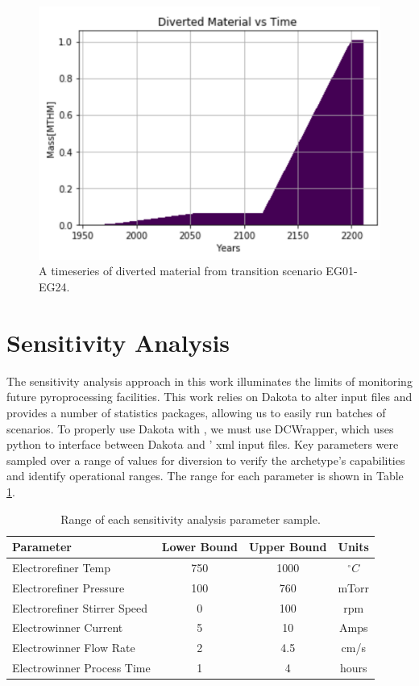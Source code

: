 \begin{figure}
	\centering
	\includegraphics[width=0.9\linewidth]{images/divertmat}
	\caption{A timeseries of diverted material from transition scenario EG01-EG24.}
	\label{fig:divertmat}
\end{figure}

\section{Sensitivity Analysis}

The sensitivity analysis approach in this work illuminates the limits of monitoring future pyroprocessing facilities. This work relies on Dakota to alter \Cyclus input files and provides a number of statistics packages, allowing us to easily
run batches of scenarios. To properly use Dakota with \Cyclus, we must use DCWrapper, which uses python to interface between Dakota and \Cyclus' xml input files. 
Key parameters were sampled over a range of values for diversion to verify the archetype's capabilities and identify operational ranges. The range for each parameter is shown in Table \ref{tab:range}. 

\begin{table}[h]
	\centering
	\begin{tabularx}{0.85\linewidth}{lccc}
		\hline
		\textbf{Parameter} & \textbf{Lower Bound} & \textbf{Upper Bound} & \textbf{Units} \\
		\hline \hline
		Electrorefiner Temp & 750 & 1000 & $^\circ C$ \\ \hline
		Electrorefiner Pressure & 100 & 760 & mTorr \\ \hline
		Electrorefiner Stirrer Speed & 0 & 100 & rpm \\ \hline
		Electrowinner Current & 5 & 10 & Amps \\ \hline
		Electrowinner Flow Rate & 2 & 4.5 & cm/s \\ \hline
		Electrowinner Process Time & 1 & 4 & hours \\ \hline
	\end{tabularx}
	\caption {Range of each sensitivity analysis parameter sample.}
	\label {tab:range}
\end{table}

